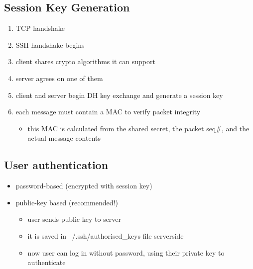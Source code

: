 \documentclass{article}
\begin{document}
\subsection{Session Key Generation}
\begin{enumerate}
    \item TCP handshake
    \item SSH handshake begins
    \item client shares crypto algorithms it can support
    \item server agrees on one of them
    \item client and server begin DH key exchange and generate a session key
    \item each message must contain a MAC to verify packet integrity
    \begin{itemize}
        \item this MAC is calculated from the shared secret, the packet seq#, and the actual message contents
    \end{itemize}
\end{enumerate}
\subsection{User authentication}
\begin{itemize}
    \item password-based (encrypted with session key)
    \item public-key based (recommended!)
    \begin{itemize}
        \item user sends public key to server
        \item it is saved in ~/.ssh/authorised_keys file serverside
        \item now user can log in without password, using their private key to authenticate
    \end{itemize}
\end{itemize}
\end{document}
